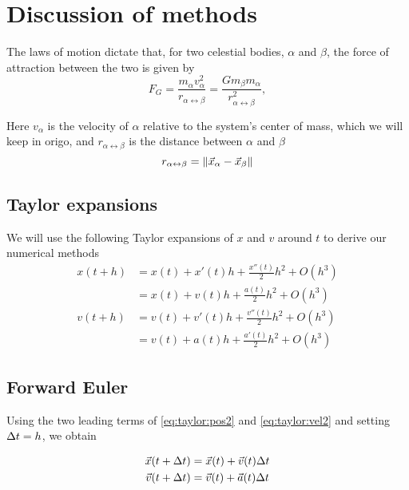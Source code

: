 \documentclass[a4paper]{article}
\begin{document}
\section{Discussion of methods}\label{sec:methods}
The laws of motion dictate that, for two celestial bodies, $\alpha$ and $\beta$, the force of attraction between the two is given by
\begin{equation}
F_G= \frac{m_{\alpha}v_{\alpha}^2}{r_{\alpha \leftrightarrow \beta}}
=\frac{Gm_{\beta}m_{\alpha}}{r_{\alpha \leftrightarrow \beta}^2},
\end{equation}

Here $v_{\alpha}$ is the velocity of $\alpha$ relative to the system's center of mass, which we will keep in origo, and $r_{\alpha \leftrightarrow \beta}$ is the distance between $\alpha$ and $\beta$
\begin{equation}
r_{\alpha \leftrightarrow \beta} = \norm{ \vec{x}_{\alpha} - \vec{x}_{\beta} }
\end{equation}

\subsection{Taylor expansions}
We will use the following Taylor expansions of $x$ and $v$ around $t$ to derive our numerical methods
\begin{align}
    x(t + h) &= x(t) + x'(t) h + \frac{x''(t)}{2} h^2 + O(h^3) \label{eq:taylor:pos1}\\
    &= x(t) + v(t) h + \frac{a(t)}{2} h^2 + O(h^3) \label{eq:taylor:pos2} \\
    v(t + h) &= v(t) + v'(t) h + \frac{v''(t)}{2} h^2 + O(h^3) \label{eq:taylor:vel1} \\
    &= v(t) + a(t) h + \frac{a'(t)}{2} h^2 + O(h^3) \label{eq:taylor:vel2}
\end{align}

\subsection{Forward Euler}
Using the two leading terms of \eqref{eq:taylor:pos2} and \eqref{eq:taylor:vel2} and setting ${\Delta t} = h$, we obtain

\begin{align}
    \vec{x}(t + {\Delta t}) &= \vec{x}(t) + \vec{v}(t){\Delta t}  \label{eq:forwardeuler:pos} \\
    \vec{v}(t + {\Delta t}) &= \vec{v}(t) + \vec{a}(t){\Delta t} \label{eq:forwardeuler:vel}
\end{align}
\end{document}
